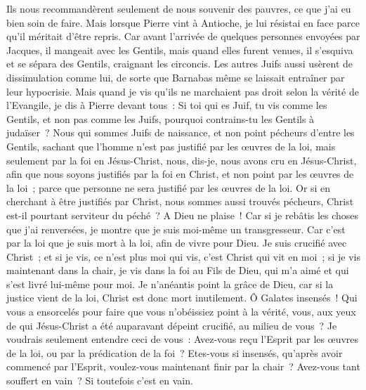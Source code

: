 \begin{multicols}{2}
Ils nous recommandèrent seulement de nous souvenir des pauvres, ce que j'ai eu bien soin de faire.
Mais lorsque Pierre vint à Antioche, je lui résistai en face parce qu'il méritait d'être repris.
Car avant l'arrivée de quelques personnes envoyées par Jacques, il mangeait avec les Gentils, mais quand elles furent venues, il s'esquiva et se sépara des Gentils, craignant les circoncis.
Les autres Juifs aussi usèrent de dissimulation comme lui, de sorte que Barnabas même se laissait entraîner par leur hypocrisie.
Mais quand je vis qu'ils ne marchaient pas droit selon la vérité de l'Evangile, je dis à Pierre devant tous~: Si toi qui es Juif, tu vis comme les Gentils, et non pas comme les Juifs, pourquoi contrains-tu les Gentils à judaïser~?
Nous qui sommes Juifs de naissance, et non point pécheurs d'entre les Gentils,
sachant que l'homme n'est pas justifié par les œuvres de la loi, mais seulement par la foi en Jésus-Christ, nous, dis-je, nous avons cru en Jésus-Christ, afin que nous soyons justifiés par la foi en Christ, et non point par les œuvres de la loi~; parce que personne ne sera justifié par les œuvres de la loi.
Or si en cherchant à être justifiés par Christ, nous sommes aussi trouvés pécheurs, Christ est-il pourtant serviteur du péché~? A Dieu ne plaise~!
Car si je rebâtis les choses que j'ai renversées, je montre que je suis moi-même un transgresseur.
Car c'est par la loi que je suis mort à la loi, afin de vivre pour Dieu.
Je suis crucifié avec Christ~; et si je vis, ce n'est plus moi qui vis, c'est Christ qui vit en moi~; si je vis maintenant dans la chair, je vis dans la foi au Fils de Dieu, qui m'a aimé et qui s'est livré lui-même pour moi.
Je n'anéantis point la grâce de Dieu, car si la justice vient de la loi, Christ est donc mort inutilement.
\VerseOne{}Ô Galates insensés~! Qui vous a ensorcelés pour faire que vous n'obéissiez point à la vérité, vous, aux yeux de qui Jésus-Christ a été auparavant dépeint crucifié, au milieu de vous~?
Je voudrais seulement entendre ceci de vous~: Avez-vous reçu l'Esprit par les œuvres de la loi, ou par la prédication de la foi~?
Etes-vous si insensés, qu'après avoir commencé par l'Esprit, voulez-vous maintenant finir par la chair~?
Avez-vous tant souffert en vain~? Si toutefois c'est en vain.

\end{multicols}
